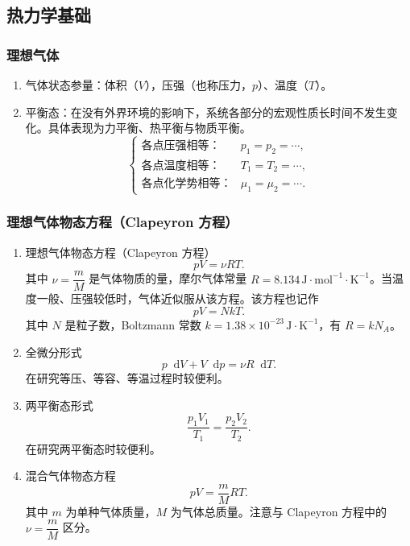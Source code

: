 \documentclass[UTF8,fontset=fandol,zihao=5]{ctexart}
\newcommand{\dif}{\mathop{}\!\mathrm{d}}
\begin{document}
\subsection{热力学基础}

\subsubsection{理想气体}

\begin{enumerate}
  \item 气体状态参量：体积（\(V\)），压强（也称压力，\(p\)）、温度（\(T\)）。
  \item 平衡态：在没有外界环境的影响下，系统各部分的宏观性质长时间不发生变化。具体表现为力平衡、热平衡与物质平衡。
  \[
    \begin{cases}
      \text{各点压强相等：}&p_1=p_2=\cdots,\\
      \text{各点温度相等：}&T_1=T_2=\cdots,\\
      \text{各点化学势相等：}&\mu_1=\mu_2=\cdots.
    \end{cases}
  \]
\end{enumerate}

\subsubsection{理想气体物态方程（Clapeyron 方程）}

\begin{enumerate}
  \item 理想气体物态方程（Clapeyron 方程）
  \[
    pV=\nu RT.
  \]
  其中 \(\nu=\dfrac mM\) 是气体物质的量，摩尔气体常量 \(R=8.134\,\mathrm{J\cdot mol^{-1}\cdot K^{-1}}\)。当温度一般、压强较低时，气体近似服从该方程。该方程也记作
  \[
    pV=NkT.
  \]
  其中 \(N\) 是粒子数，Boltzmann 常数 \(k=1.38\times10^{-23}\,\mathrm{J\cdot K^{-1}}\)，有 \(R=kN_A\)。

  \item 全微分形式
  \[
    p\dif V+V\dif p=\nu R\dif T.
  \]
  在研究等压、等容、等温过程时较便利。

  \item 两平衡态形式
  \[
    \frac{p_1V_1}{T_1}=\frac{p_2V_2}{T_2}.
  \]
  在研究两平衡态时较便利。

  \item 混合气体物态方程
  \[
    pV=\frac mMRT.
  \]
  其中 \(m\) 为单种气体质量，\(M\) 为气体总质量。注意与 Clapeyron 方程中的 \(\nu=\dfrac mM\) 区分。
\end{enumerate}
\end{document}
